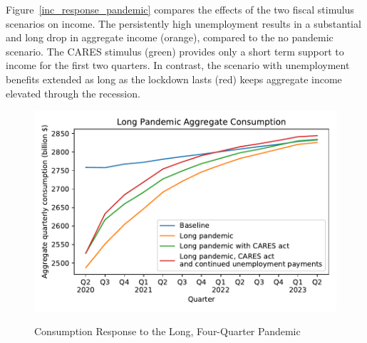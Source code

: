 \documentclass[titlepage,a4paper]{\econtex}
\begin{document}
Figure~\ref{inc_response_pandemic} compares the effects of the two fiscal stimulus scenarios on income.
The persistently high unemployment results in a substantial and long drop in aggregate income (orange), compared to the no pandemic scenario.
The CARES stimulus (green) provides only a short term support to income for the first two quarters.
In contrast, the scenario with unemployment benefits extended as long as the lockdown lasts (red) keeps aggregate income elevated through the recession.

\begin{figure}
  \centering
  \caption{Consumption Response to the Long, Four-Quarter Pandemic}
  \label{cons_response_pandemic}
  { \includegraphics[width=8in]{./Figures/DeepPandemic}}
\end{figure}
\end{document}
